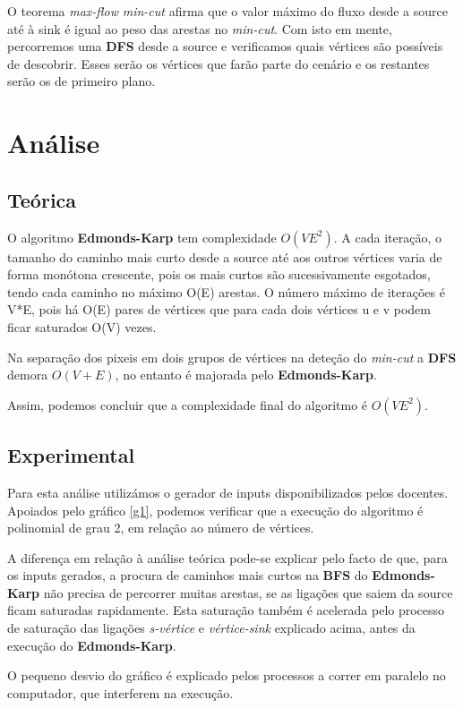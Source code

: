 \documentclass[12pt,a4paper]{article}
\begin{document}
O teorema \textit{max-flow} \textit{min-cut} afirma que o valor máximo do fluxo desde a source até à sink é igual ao peso das arestas no
\textit{min-cut}. Com isto em mente, percorremos uma \textbf{DFS} desde a source e verificamos quais vértices são possíveis de descobrir.
Esses serão os vértices que farão parte do cenário e os restantes serão os de primeiro plano.

\section{Análise}
\subsection{Teórica}
O algoritmo \textbf{Edmonds-Karp} tem complexidade $O(V{E}^2)$. A cada iteração, o tamanho do caminho mais curto desde a source até
aos outros vértices varia de forma monótona crescente, pois os mais curtos são sucessivamente esgotados, tendo cada
caminho no máximo O(E) arestas. O número máximo de iterações é V*E, pois há O(E) pares de vértices que para cada dois
vértices u e v podem ficar saturados O(V) vezes.

Na separação dos pixeis em dois grupos de vértices na deteção do \textit{min-cut} a \textbf{DFS} demora $O(V+E)$, no entanto é majorada
pelo \textbf{Edmonds-Karp}.

Assim, podemos concluir que a complexidade final do algoritmo é $O(V{E}^2)$.

\subsection{Experimental}
Para esta análise utilizámos o gerador de inputs disponibilizados pelos docentes.
Apoiados pelo gráfico \ref{g1}, podemos verificar que a execução do algoritmo é polinomial de grau 2, em relação ao número de vértices.


A diferença em relação à análise teórica pode-se explicar pelo facto de que, para os inputs gerados, a procura de caminhos mais curtos
na \textbf{BFS} do \textbf{Edmonds-Karp} não precisa de percorrer muitas arestas, se as ligações que saiem da source ficam saturadas rapidamente.
Esta saturação também é acelerada pelo processo de saturação das ligações \textit{s-vértice} e \textit{vértice-sink} explicado acima, antes da execução do \textbf{Edmonds-Karp}.

O pequeno desvio do gráfico é explicado pelos processos a correr em paralelo no computador, que interferem na execução.
\end{document}
